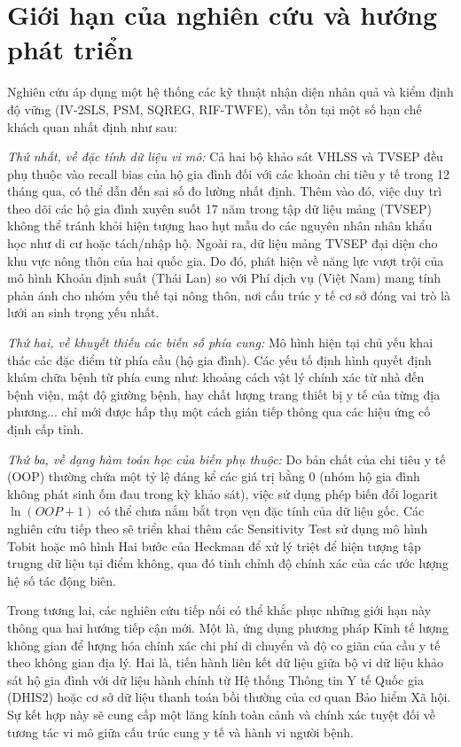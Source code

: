 \documentclass[12pt,a4paper]{article}
\begin{document}
\section{Giới hạn của nghiên cứu và hướng phát triển} 

Nghiên cứu áp dụng một hệ thống các kỹ thuật nhận diện nhân quả và kiểm định độ vững (IV-2SLS, PSM, SQREG, RIF-TWFE), vẫn tồn tại một số hạn chế khách quan nhất định như sau:

\textit{Thứ nhất, về đặc tính dữ liệu vi mô:} Cả hai bộ khảo sát VHLSS và TVSEP đều phụ thuộc vào recall bias của hộ gia đình đối với các khoản chi tiêu y tế trong 12 tháng qua, có thể dẫn đến sai số đo lường nhất định. Thêm vào đó, việc duy trì theo dõi các hộ gia đình xuyên suốt 17 năm trong tập dữ liệu mảng (TVSEP) không thể tránh khỏi hiện tượng hao hụt mẫu do các nguyên nhân nhân khẩu học như di cư hoặc tách/nhập hộ. Ngoài ra, dữ liệu mảng TVSEP đại diện cho khu vực nông thôn của hai quốc gia. Do đó, phát hiện về năng lực vượt trội của mô hình Khoán định suất (Thái Lan) so với Phí dịch vụ (Việt Nam) mang tính phản ánh cho nhóm yếu thế tại nông thôn, nơi cấu trúc y tế cơ sở đóng vai trò là lưới an sinh trọng yếu nhất.

\textit{Thứ hai, về khuyết thiếu các biến số phía cung:} Mô hình hiện tại chủ yếu khai thác các đặc điểm từ phía cầu (hộ gia đình). Các yếu tố định hình quyết định khám chữa bệnh từ phía cung như: khoảng cách vật lý chính xác từ nhà đến bệnh viện, mật độ giường bệnh, hay chất lượng trang thiết bị y tế của từng địa phương... chỉ mới được hấp thụ một cách gián tiếp thông qua các hiệu ứng cố định cấp tỉnh.

\textit{Thứ ba, về dạng hàm toán học của biến phụ thuộc:} Do bản chất của chi tiêu y tế (OOP) thường chứa một tỷ lệ đáng kể các giá trị bằng $0$ (nhóm hộ gia đình không phát sinh ốm đau trong kỳ khảo sát), việc sử dụng phép biến đổi logarit $\ln(OOP+1)$ có thể chưa nắm bắt trọn vẹn đặc tính của dữ liệu gốc. Các nghiên cứu tiếp theo sẽ triển khai thêm các Sensitivity Test sử dụng mô hình Tobit hoặc mô hình Hai bước của Heckman để xử lý triệt để hiện tượng tập trugng dữ liệu tại điểm không, qua đó tinh chỉnh độ chính xác của các ước lượng hệ số tác động biên.

Trong tương lai, các nghiên cứu tiếp nối có thể khắc phục những giới hạn này thông qua hai hướng tiếp cận mới. Một là, ứng dụng phương pháp Kinh tế lượng không gian để lượng hóa chính xác chi phí di chuyển và độ co giãn của cầu y tế theo không gian địa lý. Hai là, tiến hành liên kết dữ liệu giữa bộ vi dữ liệu khảo sát hộ gia đình với dữ liệu hành chính từ Hệ thống Thông tin Y tế Quốc gia (DHIS2) hoặc cơ sở dữ liệu thanh toán bồi thường của cơ quan Bảo hiểm Xã hội. Sự kết hợp này sẽ cung cấp một lăng kính toàn cảnh và chính xác tuyệt đối về tương tác vi mô giữa cấu trúc cung y tế và hành vi người bệnh.
\end{document}
